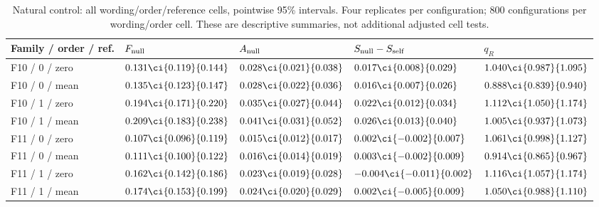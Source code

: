 \begin{table}[H]
\centering\footnotesize
\setlength{\tabcolsep}{3pt}
\caption{Natural control: all wording/order/reference cells, pointwise 95\% intervals. Four replicates per configuration; 800 configurations per wording/order cell. These are descriptive summaries, not additional adjusted cell tests.}
\label{tab:null-cells-natural}
\begin{tabularx}{\linewidth}{@{}lYYYY@{}}
\toprule
Family / order / ref. & $F_{\rm null}$ & $A_{\rm null}$ & $S_{\rm null}-S_{\rm self}$ & $q_R$ \\
\midrule
F10 / 0 / zero & $0.131\ci{0.119}{0.144}$ & $0.028\ci{0.021}{0.038}$ & $0.017\ci{0.008}{0.029}$ & $1.040\ci{0.987}{1.095}$ \\
F10 / 0 / mean & $0.135\ci{0.123}{0.147}$ & $0.028\ci{0.022}{0.036}$ & $0.016\ci{0.007}{0.026}$ & $0.888\ci{0.839}{0.940}$ \\
F10 / 1 / zero & $0.194\ci{0.171}{0.220}$ & $0.035\ci{0.027}{0.044}$ & $0.022\ci{0.012}{0.034}$ & $1.112\ci{1.050}{1.174}$ \\
F10 / 1 / mean & $0.209\ci{0.183}{0.238}$ & $0.041\ci{0.031}{0.052}$ & $0.026\ci{0.013}{0.040}$ & $1.005\ci{0.937}{1.073}$ \\
F11 / 0 / zero & $0.107\ci{0.096}{0.119}$ & $0.015\ci{0.012}{0.017}$ & $0.002\ci{-0.002}{0.007}$ & $1.061\ci{0.998}{1.127}$ \\
F11 / 0 / mean & $0.111\ci{0.100}{0.122}$ & $0.016\ci{0.014}{0.019}$ & $0.003\ci{-0.002}{0.009}$ & $0.914\ci{0.865}{0.967}$ \\
F11 / 1 / zero & $0.162\ci{0.142}{0.186}$ & $0.023\ci{0.019}{0.028}$ & $-0.004\ci{-0.011}{0.002}$ & $1.116\ci{1.057}{1.174}$ \\
F11 / 1 / mean & $0.174\ci{0.153}{0.199}$ & $0.024\ci{0.020}{0.029}$ & $0.002\ci{-0.005}{0.009}$ & $1.050\ci{0.988}{1.110}$ \\
\bottomrule
\end{tabularx}
\end{table}

